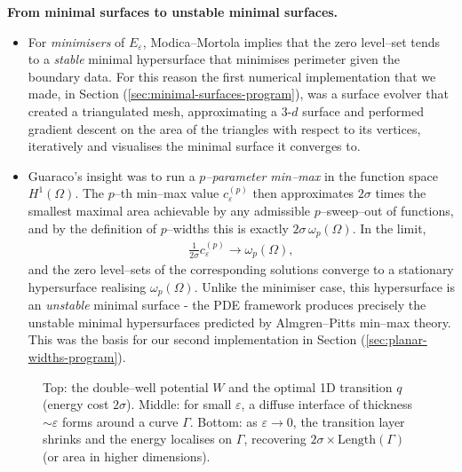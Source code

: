 \noindent
\textbf{From minimal surfaces to unstable minimal surfaces.}
\begin{itemize}
    \item For \emph{minimisers} of $E_\varepsilon$, Modica--Mortola implies that the zero level--set tends to a \emph{stable} minimal hypersurface that minimises perimeter given the boundary data. For this reason the first numerical implementation that we made, in Section (\ref{sec:minimal-surfaces-program}), was a surface evolver that created a triangulated mesh, approximating a 3-$d$ surface and performed gradient descent on the area of the triangles with respect to its vertices, iteratively and visualises the minimal surface it converges to.
    \item Guaraco’s insight was to run a \emph{$p$--parameter min--max} in the function space $H^1(\Omega)$. The $p$--th min--max value $c_\varepsilon^{(p)}$ then approximates $2\sigma$ times the smallest maximal area achievable by any admissible $p$--sweep--out of functions, and by the definition of $p$--widths this is exactly $2\sigma\,\omega_p(\Omega)$. In the limit,
    \begin{align*}
        \frac{1}{2\sigma} c_\varepsilon^{(p)} \to \omega_p(\Omega),
    \end{align*}
    and the zero level--sets of the corresponding solutions converge to a stationary hypersurface realising $\omega_p(\Omega)$. Unlike the minimiser case, this hypersurface is an \emph{unstable} minimal surface - the PDE framework produces precisely the unstable minimal hypersurfaces predicted by Almgren–Pitts min–max theory. This was the basis for our second implementation in Section (\ref{sec:planar-widths-program}).
\end{itemize} 

\begin{figure}[ht]
    \centering

    

    \vspace{0.8em}

    

    \vspace{0.8em}

    

    \caption{Top: the double–well potential $W$ and the optimal 1D transition $q$ (energy cost $2\sigma$).  
    Middle: for small $\varepsilon$, a diffuse interface of thickness $\sim \varepsilon$ forms around a curve $\Gamma$.  
    Bottom: as $\varepsilon \to 0$, the transition layer shrinks and the energy localises on $\Gamma$, recovering $2\sigma\times \mathrm{Length}(\Gamma)$ (or area in higher dimensions).}
    \label{fig:AC-interface-diagram}
\end{figure}
\FloatBarrier

